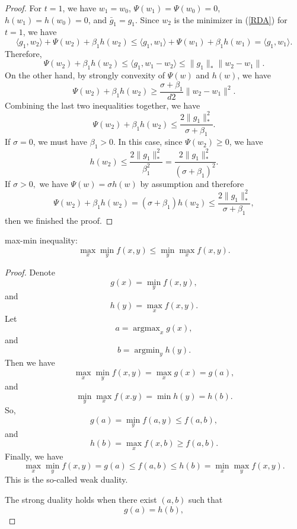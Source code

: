 \begin{proof}
	For $t=1$, we have $w_1=w_0$, $\Psi(w_1)=\Psi(w_0)=0$, $h(w_1)=h(w_0)=0$, and $\bar{g}_1=g_1$. Since $w_2$ is the minimizer in (\ref{RDA}) for $t=1$, we have
	$$
	\langle g_1,w_2 \rangle +\Psi(w_2) +\beta_1 h(w_2) \leq \langle g_1,w_1 \rangle + \Psi(w_1)+\beta_1 h(w_1) = \langle g_1,w_1 \rangle.
	$$
	Therefore,
	$$
	\Psi(w_2) + \beta_1 h(w_2)\leq \langle g_1,w_1-w_2 \rangle \leq \|g_1\|_{*}\|w_2-w_1\|.
	$$
	On the other hand, by strongly convexity of $\Psi(w)$ and $h(w)$, we have
	$$
	\Psi(w_2) + \beta_1 h(w_2)\geq \frac{\sigma+\beta_1}{d2} \|w_2-w_1\|^2.
	$$
	Combining the last two inequalities together, we have
	$$
	\Psi(w_2) + \beta_1 h(w_2)\leq \frac{2\|g_1\|_{*}^{2}}{\sigma+\beta_1}.
	$$
	If $\sigma=0$, we must have $\beta_1>0$. In this case, since $\Psi(w_2)\geq 0$, we have
	$$
	h(w_2)\leq \frac{2\|g_1\|^2_{*}}{\beta_1^2}=\frac{2\|g_1\|^2_{*}}{(\sigma+\beta_1)^2}.
	$$
	If $\sigma>0,$ we have $\Psi(w) = \sigma h(w)$ by assumption and therefore
	$$
	\Psi(w_2) + \beta_1 h(w_2) = (\sigma + \beta_1) h(w_2)\leq \frac{2\|g_1\|_{*}^{2}}{\sigma+\beta_1},
	$$
	then we finished the proof.
\end{proof}

\begin{lemma}
	max-min inequality:
	\begin{equation}
		\max_x \min_y f(x,y) \leq \min_y \max_x f(x,y).
	\end{equation}
\end{lemma}
\begin{proof}
	Denote
	\begin{equation}
		g(x) = \min_y f(x,y),
	\end{equation}
	and
	\begin{equation}
		h(y) =\max_x f(x,y).
	\end{equation}
	Let
	\begin{equation}
		a= \mathop{\arg \max}_x g(x),
	\end{equation}
	and
	\begin{equation}
		b = \mathop{\arg \min}_y h(y).
	\end{equation}
	Then we have
	\begin{equation}
		\max_x \min_y f(x,y) =\max_x g(x) =g(a),
	\end{equation}
	and
	\begin{equation}
		\min_y \max_x f(x.y) = \min h(y) = h(b).
	\end{equation}
	So,
	\begin{equation}
		g(a)= \min_y f(a,y) \leq f(a,b),
	\end{equation}
	and
	\begin{equation}
		h(b) = \max_x f(x,b) \geq f(a,b).
	\end{equation}
	Finally, we have
	\begin{equation}
		\max_x \min_y f(x,y) =g(a) \leq f(a,b) \leq h(b) =\min_x \max_y f(x,y).
	\end{equation}
	This is the so-called weak duality.
	
	The strong duality holds when there exist $(a,b)$ such that
	\begin{equation}
		g(a) = h(b),
	\end{equation}
\end{proof}

